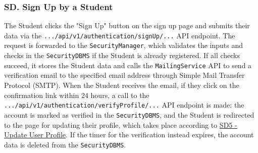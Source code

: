 \setcounter{uc}{1}
\newcommand{\cuc}{\theuc{}}

\subsubsection*{SD\cuc. Sign Up by a Student}
\label{subsubsec:signup_student_sd}
The Student clicks the "Sign Up" button on the sign up page and submits their data via the \texttt{.../api/v1/authentication/signUp/...} API endpoint. The request is forwarded to the \texttt{SecurityManager}, which validates the inputs and checks in the \texttt{SecurityDBMS} if the Student is already registered. If all checks succeed, it stores the Student data and calls the \texttt{MailingService} API to send a verification email to the specified email address through Simple Mail Transfer Protocol (SMTP). When the Student receives the email, if they click on the confirmation link within 24 hours, a call to the \texttt{.../api/v1/authentication/verifyProfile/...} API endpoint is made: the account is marked as verified in the \texttt{SecurityDBMS}, and the Student is redirected to the page for updating their profile, which takes place according to \hyperref[fig:update_profile_sd]{\protect\uline{SD5 - Update User Profile}}. If the timer for the verification instead expires, the account data is deleted from the \texttt{SecurityDBMS}.

\newpage

